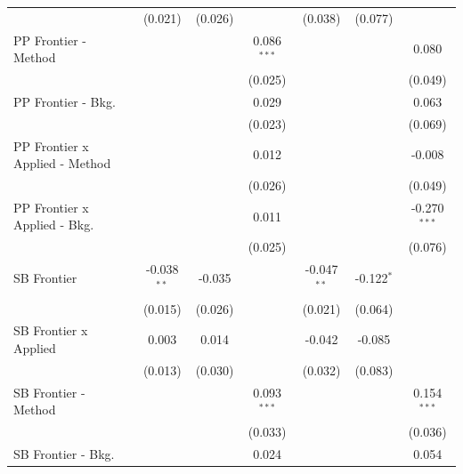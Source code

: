 \begin{tabular}{lcccccc}
                                  & (0.021)        & (0.026)        &               & (0.038)        & (0.077)       &   \\   
   PP Frontier - Method           &                &                & 0.086$^{***}$ &                &               & 0.080\\   
                                  &                &                & (0.025)       &                &               & (0.049)\\   
   PP Frontier - Bkg.             &                &                & 0.029         &                &               & 0.063\\   
                                  &                &                & (0.023)       &                &               & (0.069)\\   
   PP Frontier x Applied - Method &                &                & 0.012         &                &               & -0.008\\   
                                  &                &                & (0.026)       &                &               & (0.049)\\   
   PP Frontier x Applied - Bkg.   &                &                & 0.011         &                &               & -0.270$^{***}$\\   
                                  &                &                & (0.025)       &                &               & (0.076)\\   
   SB Frontier                    & -0.038$^{**}$  & -0.035         &               & -0.047$^{**}$  & -0.122$^{*}$  &   \\   
                                  & (0.015)        & (0.026)        &               & (0.021)        & (0.064)       &   \\   
   SB Frontier x Applied          & 0.003          & 0.014          &               & -0.042         & -0.085        &   \\   
                                  & (0.013)        & (0.030)        &               & (0.032)        & (0.083)       &   \\   
   SB Frontier - Method           &                &                & 0.093$^{***}$ &                &               & 0.154$^{***}$\\   
                                  &                &                & (0.033)       &                &               & (0.036)\\   
   SB Frontier - Bkg.             &                &                & 0.024         &                &               & 0.054\\   

\end{tabular}
